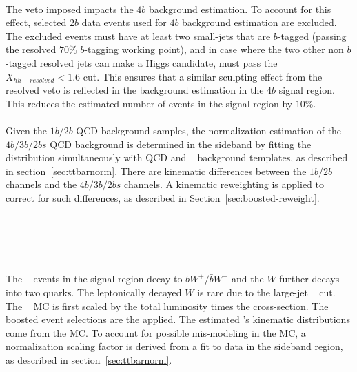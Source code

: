 \paragraph{} 
The veto imposed impacts the $4b$ background estimation. 
To account for this effect, selected $2b$ data events used for $4b$ background estimation are excluded.
The excluded events must have at least two small-\R jets that are $b$-tagged (passing the resolved $70\%$ $b$-tagging working point), and in case where the two other non $b$-tagged resolved jets can make a Higgs candidate, must pass the $X_{hh-resolved} < 1.6$ cut.
This ensures that a similar sculpting effect from the resolved veto is reflected in the background estimation in the $4b$ signal region.
This reduces the estimated number of events in the signal region by $10\%$.

\paragraph{}
Given the $1b/2b$ QCD background samples, the normalization estimation of the $4b/3b/2bs$ QCD background is determined in the sideband by fitting the \mleadJ~ distribution simultaneously with QCD and \ttbar~ background templates, as described in section~\ref{sec:ttbarnorm}.
There are kinematic differences between the $1b/2b$ channels and the $4b/3b/2bs$ channels.  
A kinematic reweighting is applied to correct for such differences, as described in Section~\ref{sec:boosted-reweight}.


\section{\ttbar~}
\label{sec:boosted-ttbar}

\paragraph{}
The \ttbar~ events in the signal region decay to $bW^{+}/\bar{b}W^{-}$ and the $W$ further decays into two quarks.
The leptonically decayed $W$ is rare due to the large-\R jet \pt~ cut.
The \ttbar~ MC is first scaled by the total luminosity times the cross-section.
The boosted event selections are the applied.
The estimated \ttbar's kinematic distributions come from the MC.
To account for possible mis-modeling in the MC, a normalization scaling factor is derived from a fit to data in the sideband region, as described in section~\ref{sec:ttbarnorm}.

